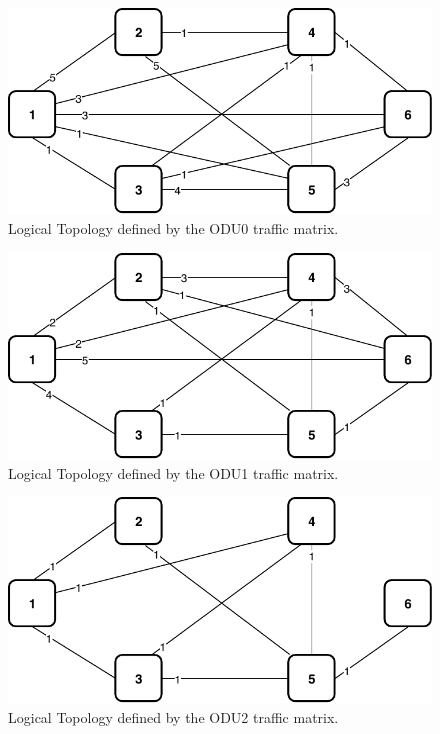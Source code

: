 \newpage
\begin{figure}[h!]
\centering
\includegraphics[width=12cm]{sdf/ilp/transparent_protection/figures/logical_topology_ODU0_low}
\caption{Logical Topology defined by the ODU0 traffic matrix.}
\label{logical2_ODU0_protectionlow}
\end{figure}

\begin{figure}[h!]
\centering
\includegraphics[width=12cm]{sdf/ilp/transparent_protection/figures/logical_topology_ODU1_low}
\caption{Logical Topology defined by the ODU1 traffic matrix.}
\label{logical2_ODU1_protectionlow}
\end{figure}

\begin{figure}[h!]
\centering
\includegraphics[width=12cm]{sdf/ilp/transparent_protection/figures/logical_topology_ODU2_low}
\caption{Logical Topology defined by the ODU2 traffic matrix.}
\label{logical2_ODU2_protectionlow}
\end{figure}

